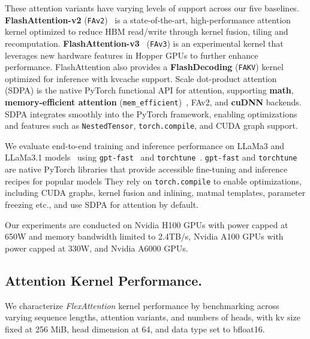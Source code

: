 These attention variants have varying levels of support across our five baselines. \textbf{FlashAttention-v2} ({\tt FAv2})~\cite{flashattention2} is a state-of-the-art, high-performance attention kernel optimized to reduce HBM read/write through kernel fusion, tiling and recomputation. \textbf{FlashAttention-v3}~\cite{FA3} ({\tt FAv3}) is an experimental kernel that leverages new hardware features in Hopper GPUs to further enhance performance. FlashAttention also provides a \textbf{FlashDecoding} ({\tt FAKV}) kernel optimized for inference with kvcache support. Scale dot-product attention (SDPA) is the native PyTorch functional API for attention, supporting\textbf{ math}, \textbf{memory-efficient attention} ({\tt mem\_efficient})~\cite{mem_efficient}, FAv2, and \textbf{cuDNN} backends. SDPA integrates smoothly into the PyTorch framework, enabling optimizations and features such as {\tt NestedTensor}, {\tt torch.compile}, and CUDA graph support. \par


We evaluate end-to-end training and inference performance on LLaMa3 and LLaMa3.1 models~\cite{llama3} using {\tt gpt-fast}~\cite{gpt-fast} and {\tt torchtune}~\cite{torchtune}. {\tt gpt-fast} and {\tt torchtune} are native PyTorch libraries that provide accessible fine-tuning and inference recipes for popular models They rely on {\tt torch.compile} to enable optimizations, including CUDA graphs, kernel fusion and inlining, matmal templates, parameter freezing etc., and use SDPA for attention by default. \par
Our experiments are conducted on Nvidia H100 GPUs with power capped at 650W and memory bandwidth limited to 2.4TB/s, Nvidia A100 GPUs with power capped at 330W, and Nvidia A6000 GPUs.



\subsection{Attention Kernel Performance. }

We characterize \textit{FlexAttention} kernel performance by benchmarking across varying sequence lengths, attention variants, and numbers of heads, with kv size fixed at 256 MiB, head dimension at 64, and data type set to bfloat16. \par



